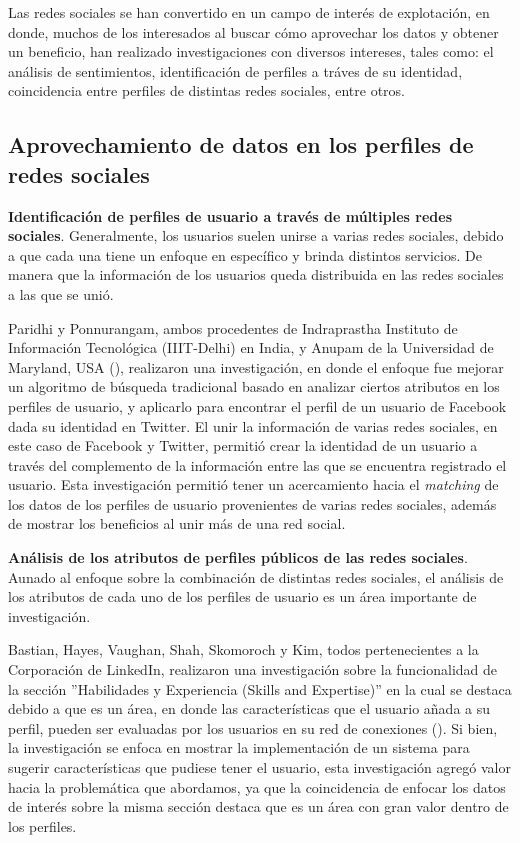 Las redes sociales se han convertido en un campo de interés de explotación, en donde, muchos de los interesados al buscar cómo aprovechar los datos y obtener un beneficio, han realizado investigaciones con diversos intereses, tales como: el análisis de sentimientos, identificación de perfiles a tráves de su identidad, coincidencia entre perfiles de distintas redes sociales, entre otros.

\subsection{Aprovechamiento de datos en los perfiles de redes sociales}
\label{subsec:subsec01} 


\textbf{Identificación de perfiles de usuario a través de múltiples redes sociales}.
Generalmente, los usuarios suelen unirse a varias redes sociales, debido a que cada una tiene un enfoque en específico y  brinda distintos servicios. De manera que la información de los usuarios queda distribuida en las redes sociales a las que se unió.

Paridhi y Ponnurangam, ambos procedentes de Indraprastha Instituto de Información Tecnológica (IIIT-Delhi) en India, y Anupam de la Universidad de Maryland, USA (\citeyear{art_usersacross}), realizaron una investigación, en donde el enfoque fue mejorar un algoritmo de búsqueda tradicional basado en analizar ciertos atributos en los perfiles de usuario, y aplicarlo para encontrar el perfil de un usuario de Facebook dada su identidad en Twitter. El unir la información de varias redes sociales, en este caso de Facebook y Twitter, permitió crear la identidad de un usuario a través del complemento de la información entre las que se encuentra registrado el usuario. Esta investigación permitió tener un acercamiento hacia el \textit{matching} de los datos de los perfiles de usuario provenientes de varias redes sociales, además de mostrar los beneficios al unir más de una red social.

\textbf{Análisis de los atributos de perfiles públicos de las redes sociales}. Aunado al enfoque sobre la combinación de distintas redes sociales, el análisis de los atributos de cada uno de los perfiles de usuario es un área importante de investigación.

Bastian, Hayes, Vaughan, Shah, Skomoroch y Kim, todos pertenecientes a la Corporación de LinkedIn, realizaron una investigación sobre la funcionalidad de la sección ''Habilidades y Experiencia (Skills and Expertise)'' en la cual se destaca debido a que es un área, en donde las características que el usuario añada a su perfil, pueden ser evaluadas por los usuarios en su red de conexiones (\citeyear{art_skill_exp_link}). Si bien, la investigación se enfoca en mostrar la implementación de un sistema para sugerir características que pudiese tener el usuario, esta investigación agregó valor hacia la problemática que abordamos, ya que la coincidencia de enfocar los datos de interés sobre la misma sección destaca que es un área con gran valor dentro de los perfiles.

